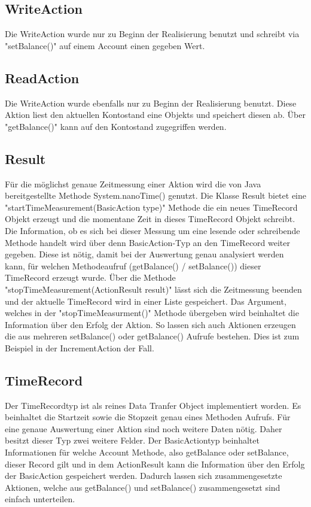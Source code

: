 \subsection{WriteAction}
\label{sec:writeAction}
Die WriteAction wurde nur zu Beginn der Realisierung benutzt und schreibt via "setBalance()" auf einem Account einen gegeben Wert. 

\subsection{ReadAction}
\label{sec:readAction}
Die WriteAction wurde ebenfalls nur zu Beginn der Realisierung benutzt. Diese Aktion liest den aktuellen Kontostand eine Objekts und speichert diesen ab. Über "getBalance()" kann auf den Kontostand zugegriffen werden.

\subsection{Result}
\label{sec:result}
Für die möglichst genaue Zeitmessung einer Aktion wird die von Java bereitgestellte Methode System.nanoTime() genutzt. Die Klasse Result bietet eine "startTimeMeasurement(BasicAction type)" Methode die ein neues TimeRecord Objekt erzeugt und die momentane Zeit in dieses TimeRecord Objekt schreibt. Die Information, ob es sich bei dieser Messung um eine lesende oder schreibende Methode handelt wird über denn BasicAction-Typ an den TimeRecord weiter gegeben. Diese ist nötig, damit bei der Auswertung genau analysiert werden kann, für welchen Methodeaufruf (getBalance() / setBalance()) dieser TimeRecord erzeugt wurde. Über die Methode "stopTimeMeasurement(ActionResult result)" lässt sich die Zeitmessung beenden und der aktuelle TimeRecord wird in einer Liste gespeichert. Das Argument, welches in der "stopTimeMeasurment()" Methode übergeben wird beinhaltet die Information über den Erfolg der Aktion. So lassen sich auch Aktionen erzeugen die aus mehreren setBalance() oder getBalance() Aufrufe bestehen. Dies ist zum Beispiel in der IncrementAction der Fall.

\subsection{TimeRecord}
\label{sec:timeRecord}
Der TimeRecordtyp ist als reines Data Tranfer Object implementiert worden. Es beinhaltet die Startzeit sowie die Stopzeit genau eines Methoden Aufrufs. Für eine genaue Auswertung einer Aktion sind noch weitere Daten nötig. Daher besitzt dieser Typ zwei weitere Felder. Der BasicActiontyp beinhaltet Informationen für welche Account Methode, also getBalance oder setBalance, dieser Record gilt und in dem ActionResult kann die Information über den Erfolg der BasicAction gespeichert werden. Dadurch lassen sich zusammengesetzte Aktionen, welche aus getBalance() und setBalance() zusammengesetzt sind einfach unterteilen.

